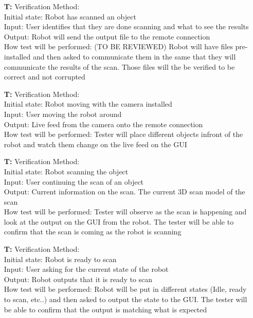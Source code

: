\documentclass[12pt, titlepage]{article}
\newcounter{tnum} %
\begin{document}
\begin{itemize}
\item[\textbf{T\refstepcounter{tnum}\thetnum:}]
Verification Method:\\
Initial state: Robot has scanned an object \\
Input: User identifies that they are done scanning and what to see the results \\
Output: Robot will send the output file to the remote connection  \\
How test will be performed: (TO BE REVIEWED) Robot will have files pre-installed and then asked to communicate them in the same that they will communicate the results of the scan. Those files will the be verified to be correct and not corrupted \\

\item[\textbf{T\refstepcounter{tnum}\thetnum:}]
Verification Method: \\
Initial state: Robot moving with the camera installed \\
Input: User moving the robot around \\
Output: Live feed from the camera onto the remote connection \\
How test will be performed: Tester will place different objects infront of the robot and watch them change on the live feed on the GUI\\

\item[\textbf{T\refstepcounter{tnum}\thetnum:}]
Verification Method:\\
Initial state: Robot scanning the object\\
Input: User continuing the scan of an object \\
Output: Current information on the scan. The current 3D scan model of the scan\\
How test will be performed: Tester will observe as the scan is happening and look at the output on the GUI from the robot. The tester will be able to confirm that the scan is coming as the robot is scanning\\

\item[\textbf{T\refstepcounter{tnum}\thetnum:}]
Verification Method:\\
Initial state: Robot is ready to scan\\
Input: User asking for the current state of the robot\\
Output: Robot outputs that it is ready to scan\\
How test will be performed: Robot will be put in different states (Idle, ready to scan, etc..) and then asked to output the state to the GUI. The tester will be able to confirm that the output is matching what is expected \\

\end{itemize}
\end{document}
